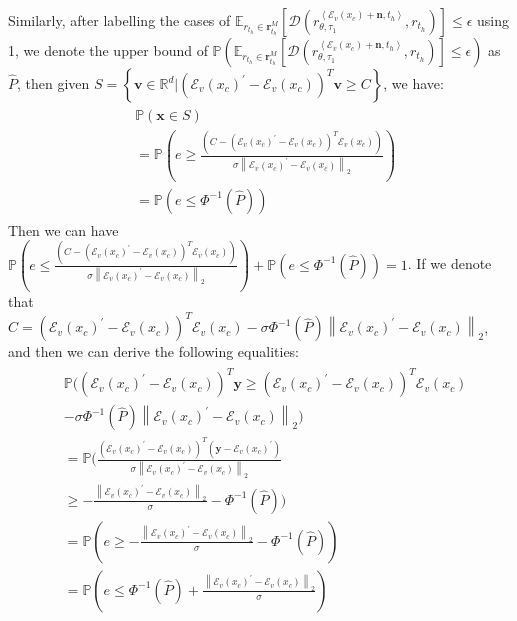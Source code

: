 Similarly, after labelling the cases of $\mathbb{E}_{r_{t_h}\in\mathbf{r}_{t_h}^M}[\mathcal{D}(r_{\theta, \tau_1}^{\left<\mathcal{E}_v(x_c)+\mathbf{n}, t_h\right>}, r_{t_h})]\leq\epsilon$ using 1, we denote the upper bound of $\mathbb{P}(\mathbb{E}_{r_{t_h}\in\mathbf{r}_{t_h}^M}[\mathcal{D}(r_{\theta, \tau_1}^{\left<\mathcal{E}_v(x_c)+\mathbf{n}, t_h\right>}, r_{t_h})]\leq\epsilon)$ as $\hat{P}$, then given $S = \left\{\mathbf{v}\in\mathbb{R}^d|(\mathcal{E}_v(x_c)^{\prime}-\mathcal{E}_v(x_c))^T\mathbf{v}\geq C\right\}$, we have:
\begin{align}
\begin{split}
&\mathbb{P}(\mathbf{x}\in S)\\
&=\mathbb{P}(e\geq \frac{(C - (\mathcal{E}_v(x_c)^{\prime} - \mathcal{E}_v(x_c))^T\mathcal{E}_v(x_c))}{\sigma\left\|\mathcal{E}_v(x_c)^{\prime} - \mathcal{E}_v(x_c)\right\|_2})\\
&= \mathbb{P}(e\leq\Phi^{-1}(\hat{P}))
\end{split}
\end{align}
Then we can have $
\mathbb{P}(e\leq \frac{(C - (\mathcal{E}_v(x_c)^{\prime} - \mathcal{E}_v(x_c))^T\mathcal{E}_v(x_c))}{\sigma\left\|\mathcal{E}_v(x_c)^{\prime} - \mathcal{E}_v(x_c)\right\|_2}) + \mathbb{P}(e\leq\Phi^{-1}(\hat{P})) = 1$. If we denote that $C =(\mathcal{E}_v(x_c)^{\prime} - \mathcal{E}_v(x_c))^T\mathcal{E}_v(x_c) - \sigma\Phi^{-1}(\hat{P})\left\|\mathcal{E}_v(x_c)^{\prime} - \mathcal{E}_v(x_c)\right\|_2$, and then we can derive the following equalities:
\begin{align}
\begin{split}
&\mathbb{P}((\mathcal{E}_v(x_c)^{\prime}-\mathcal{E}_v(x_c))^T\mathbf{y}\geq(\mathcal{E}_v(x_c)^{\prime}-\mathcal{E}_v(x_c))^T\mathcal{E}_v(x_c)\\
&-\sigma\Phi^{-1}(\hat{P})\left\|\mathcal{E}_v(x_c)^{\prime} - \mathcal{E}_v(x_c)\right\|_2)\\
&=\mathbb{P}(\frac{(\mathcal{E}_v(x_c)^{\prime}-\mathcal{E}_v(x_c))^T(\mathbf{y}-\mathcal{E}_v(x_c)^{\prime})}{\sigma\left\|\mathcal{E}_v(x_c)^{\prime}-\mathcal{E}_v(x_c)\right\|_2}\\
&\geq-\frac{\left\|\mathcal{E}_v(x_c)^{\prime} - \mathcal{E}_v(x_c)\right\|_2}{\sigma}-\Phi^{-1}(\hat{P}))\\
&= \mathbb{P}(e\geq-\frac{\left\|\mathcal{E}_v(x_c)^{\prime}-\mathcal{E}_v(x_c)\right\|_2}{\sigma}-\Phi^{-1}(\hat{P}))\\
&=\mathbb{P}(e\leq\Phi^{-1}(\hat{P})+\frac{\left\|\mathcal{E}_v(x_c)^{\prime}-\mathcal{E}_v(x_c)\right\|_2}{\sigma})
\end{split}
\end{align}
